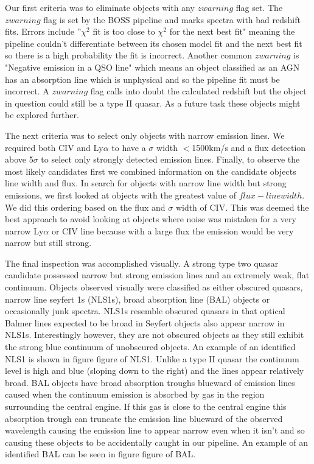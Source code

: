 \documentclass[preprint]{aastex}
\begin{document}
Our first criteria was to eliminate objects with any $zwarning$ flag set.  The $zwarning$ flag is set by the BOSS pipeline and marks spectra with bad redshift fits.  Errors include ''${\chi}^2$ fit is too close to ${\chi}^2$ for the next best fit"  meaning the pipeline couldn't differentiate between its chosen model fit and the next best fit so there is a high probability the fit is incorrect.  Another common $zwarning$ is "Negative emission in a QSO line" which means an object classified as an AGN has an absorption line which is unphysical and so the pipeline fit must be incorrect.  A $zwarning$ flag calls into doubt the calculated redshift but the object in question could still be a type II quasar.  As a future task these objects might be explored further.  

The next criteria was to select only objects with narrow emission lines.  We required both CIV and Ly$\alpha$ to have a $\sigma$ width $<$1500km/s and a flux detection above 5$\sigma$ to select only strongly detected emission lines.  Finally, to observe the most likely candidates first we combined information on the candidate objects line width and flux.  In search for objects with narrow line width but strong emissions, we first looked at objects with the greatest value of $flux - line width$.  We did this ordering based on the flux and $\sigma$ width of CIV.  This was deemed the best approach to avoid looking at objects where noise was mistaken for a very narrow Ly$\alpha$ or CIV line because with a large flux the emission would be very narrow but still strong.

The final inspection was accomplished visually.  A strong type two quasar candidate possessed narrow but strong emission lines and an extremely weak, flat continuum.  Objects observed visually were classified as either obscured quasars, narrow line seyfert 1s (NLS1s), broad absorption line (BAL) objects or occasionally junk spectra.  NLS1s resemble obscured quasars in that optical Balmer lines expected to be broad in Seyfert objects also appear narrow in NLS1s.  Interestingly however, they are not obscured objects as they still exhibit the strong blue continuum of unobscured objects.  An example of an identified NLS1 is shown in figure \color{red}figure of NLS1\color{black}.  Unlike a type II quasar the continuum level is high and blue (sloping down to the right) and the lines appear relatively broad.  BAL objects have broad absorption troughs blueward of emission lines caused when the continuum emission is absorbed by gas in the region surrounding the central engine.  If this gas is close to the central engine this absorption trough can truncate the emission line blueward of the observed wavelength causing the emission line to appear narrow even when it isn't and so causing these objects to be accidentally caught in our pipeline.  An example of an identified BAL can be seen in figure \color{red}figure of BAL\color{black}. 
\end{document}
